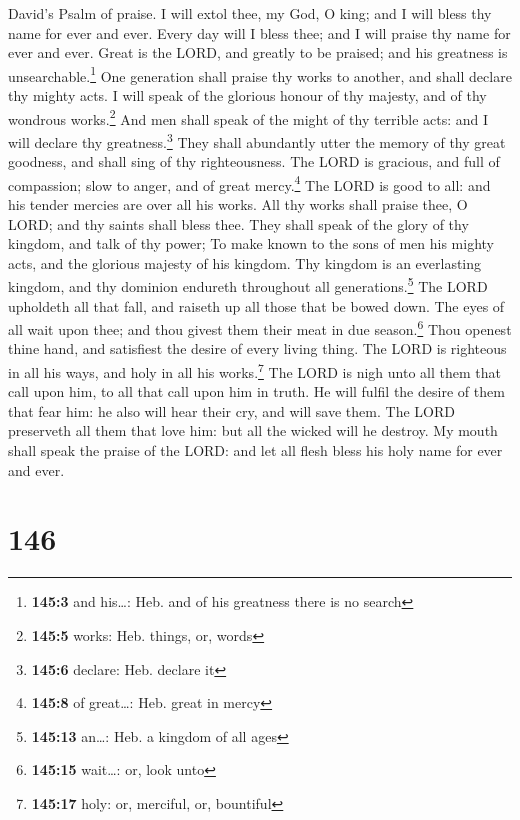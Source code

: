 David's Psalm of praise.  I will extol thee, my God, O
king; and I will bless thy name for ever and ever.  Every
day will I bless thee; and I will praise thy name for ever and ever.
 Great is the LORD, and greatly to be praised; and his
greatness is unsearchable.\footnote{\textbf{145:3} and his\ldots: Heb.
  and of his greatness there is no search}  One generation
shall praise thy works to another, and shall declare thy mighty acts.
 I will speak of the glorious honour of thy majesty, and
of thy wondrous works.\footnote{\textbf{145:5} works: Heb. things, or,
  words}  And men shall speak of the might of thy terrible
acts: and I will declare thy greatness.\footnote{\textbf{145:6} declare:
  Heb. declare it}  They shall abundantly utter the memory
of thy great goodness, and shall sing of thy righteousness.
 The LORD is gracious, and full of compassion; slow to
anger, and of great mercy.\footnote{\textbf{145:8} of great\ldots: Heb.
  great in mercy}  The LORD is good to all: and his tender
mercies are over all his works.  All thy works shall
praise thee, O LORD; and thy saints shall bless thee. 
They shall speak of the glory of thy kingdom, and talk of thy power;
 To make known to the sons of men his mighty acts, and
the glorious majesty of his kingdom.  Thy kingdom is an
everlasting kingdom, and thy dominion endureth throughout all
generations.\footnote{\textbf{145:13} an\ldots: Heb. a kingdom of all
  ages}  The LORD upholdeth all that fall, and raiseth up
all those that be bowed down.  The eyes of all wait upon
thee; and thou givest them their meat in due season.\footnote{\textbf{145:15}
  wait\ldots: or, look unto}  Thou openest thine hand,
and satisfiest the desire of every living thing.  The
LORD is righteous in all his ways, and holy in all his works.\footnote{\textbf{145:17}
  holy: or, merciful, or, bountiful}  The LORD is nigh
unto all them that call upon him, to all that call upon him in truth.
 He will fulfil the desire of them that fear him: he also
will hear their cry, and will save them.  The LORD
preserveth all them that love him: but all the wicked will he destroy.
 My mouth shall speak the praise of the LORD: and let all
flesh bless his holy name for ever and ever.

\hypertarget{section-147}{%
\section{146}\label{section-147}}

